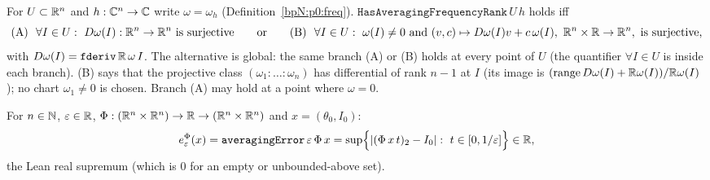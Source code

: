 \begin{definition}\label{bpN:p0:avg-rank}
For $U\subset\mathbb{R}^n$ and $h:\mathbb{C}^n\to\mathbb{C}$ write $\omega=\omega_h$ (Definition~\ref{bpN:p0:freq}). $\texttt{HasAveragingFrequencyRank}\,U\,h$ holds iff
\[\text{(A)}\ \ \forall I\in U:\ D\omega(I):\R^n\to\R^n\ \text{is surjective}\qquad\text{or}\qquad
\text{(B)}\ \ \forall I\in U:\ \omega(I)\ne0\ \text{and}\ (v,c)\mapsto D\omega(I)v+c\,\omega(I),\ \R^n\times\R\to\R^n,\ \text{is surjective,}\]
with $D\omega(I)=\texttt{fderiv}\,\mathbb{R}\,\omega\,I$. The alternative is global: the same branch (A) or (B) holds at every point of $U$
(the quantifier $\forall I\in U$ is inside each branch). (B) says that the projective class $(\omega_1:\dots:\omega_n)$ has differential of rank $n-1$ at $I$
(its image is $(\operatorname{range}D\omega(I)+\mathbb{R}\omega(I))/\mathbb{R}\omega(I)$); no chart $\omega_1\ne0$ is chosen. Branch (A) may hold at a point where $\omega=0$.
\end{definition}

\begin{definition}\label{bpN:p0:avg-error}
For $n\in\mathbb{N}$, $\varepsilon\in\mathbb{R}$, $\Phi:(\mathbb{R}^n\times\mathbb{R}^n)\to\mathbb{R}\to(\mathbb{R}^n\times\mathbb{R}^n)$ and $x=(\theta_0,I_0)$:
\[e_\varepsilon^\Phi(x)=\texttt{averagingError}\,\varepsilon\,\Phi\,x=\sup\Bigl\{\abs{(\Phi\,x\,t)_2-I_0}:\ t\in[0,1/\varepsilon]\Bigr\}\in\R,\]
the Lean real supremum  (which is $0$ for an empty or unbounded-above set).
\end{definition}

